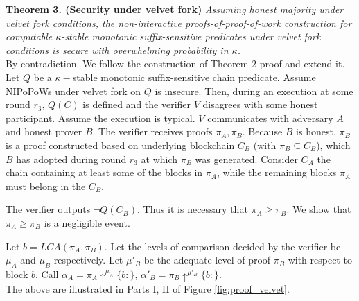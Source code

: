 \documentclass[9pt,a4paper]{article}
\begin{document}
\textbf{Theorem 3. (Security under velvet fork)} \textit{Assuming honest majority under velvet fork conditions, the non-interactive proofs-of-proof-of-work construction for computable $\kappa$-stable monotonic suffix-sensitive predicates under velvet fork conditions is secure with overwhelming probability in $\kappa$.}\\

By contradiction. We follow the construction of Theorem 2 proof and extend it. Let $Q$ be a $\kappa-$stable monotonic suffix-sensitive chain predicate. Assume NIPoPoWs under velvet fork on $Q$ is insecure. Then, during an execution at some round  $r_3$, $Q(C)$ is defined and the verifier $V$ disagrees with some honest participant. Assume the execution is typical. $V$ communicates with adversary $A$ and honest prover $B$. The verifier receives proofs $\pi_A, \pi_B$. Because $B$ is honest, $\pi_B$ is a proof constructed based on underlying blockchain $C_B$ (with $\pi_B \subseteq C_B$), which $B$ has adopted during round $r_3$ at which $\pi_B$ was generated. Consider $C_A$ the chain containing at least some of the blocks in $\pi_A$, while the remaining blocks $\pi_A$ must belong in the $C_B$. 

The verifier outputs $\neg Q(C_B)$. Thus it is necessary that $\pi_A \geq \pi_B$. We show that $\pi_A \geq \pi_B$ is a negligible event. 

Let $b = LCA(\pi_A, \pi_B)$. Let the levels of comparison decided by the verifier be $\mu_A$ and $\mu_B$ respectively. Let $\mu'_B$ be the adequate level of proof $\pi_B$  with respect to block $b$. Call $\alpha_A = \pi_A \uparrow^{\mu_A}\{b:\}$, 
$\alpha'_B = \pi_B \uparrow^{\mu'_B}\{b:\}$.\\

The above are illustrated in Parts I, II of Figure \ref{fig:proof_velvet}.
\end{document}
